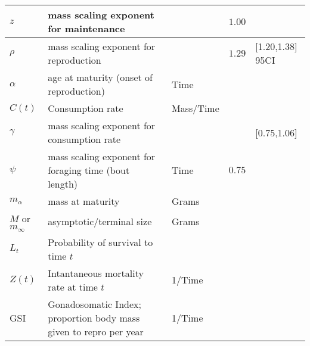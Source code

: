 \documentclass[a4paper]{article} %
\begin{document}
\begin{tabularx}{\linewidth}{|X|X|X|X|X|}
    $z$                 & mass scaling exponent for maintenance                     &                           & $1.00$                                        &                     \\ \hline
    $\rho$              & mass scaling exponent for reproduction                    &                           & $1.29$ \autocite{Barneche2018d}               & [1.20,1.38] 95CI                    \\ \hline
    $\alpha$            & age at maturity (onset of reproduction)                   & Time             &                                               &             \\ \hline
    $C(t)$              & Consumption rate                   & Mass/Time             &                                               &             \\ \hline
    $\gamma$            & mass scaling exponent for consumption rate                    &              &                                               & [0.75,1.06] \autocite{Pawar2012}            \\ \hline
    $\psi$            & mass scaling exponent for foraging time (bout length)                   & Time             & $0.75$                                              &             \\ \hline
    $m_{\alpha}$        & mass at maturity                                          & Grams                     &                                               &             \\ \hline
    $M$ or $m_{\infty}$ & asymptotic/terminal size                                  & Grams                     &                                               &             \\ \hline
    $L_t$               & Probability of survival to time $t$                       &                           &                                               &             \\ \hline
    $Z(t)$              & Intantaneous mortality rate at time $t$                     & 1/Time                           &                                               &             \\ \hline
    GSI                 & Gonadosomatic Index; proportion body mass given to repro per year & 1/Time                           &                                               &             \\ \hline
\end{tabularx}
\end{document}
